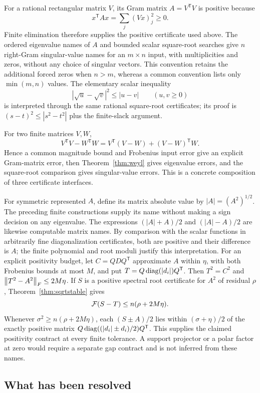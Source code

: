 For a rational rectangular matrix $V$, its Gram matrix $A=V^{\mathsf T}V$ is positive because
\[
 x^{\mathsf T}Ax=\sum_j(Vx)_j^2\ge0.
\]
Finite elimination therefore supplies the positive certificate used above. The ordered eigenvalue names of $A$ and bounded scalar square-root searches give $n$ right-Gram singular-value names for an $m\times n$ input, with multiplicities and zeros, without any choice of singular vectors. This convention retains the additional forced zeros when $n>m$, whereas a common convention lists only $\min(m,n)$ values. The elementary scalar inequality
\[
 |\sqrt u-\sqrt v|^2\le|u-v|\qquad(u,v\ge0)
\]
is interpreted through the same rational square-root certificates; its proof is $(s-t)^2\le|s^2-t^2|$ plus the finite-slack argument.

For two finite matrices $V,W$,
\[
 V^{\mathsf T}V-W^{\mathsf T}W
 =V^{\mathsf T}(V-W)+(V-W)^{\mathsf T}W.
\]
Hence a common magnitude bound and Frobenius input error give an explicit Gram-matrix error, then Theorem~\ref{thm:weyl} gives eigenvalue errors, and the square-root comparison gives singular-value errors. This is a concrete composition of three certificate interfaces.

For symmetric represented $A$, define its matrix absolute value by
$|A|=(A^2)^{1/2}$. The preceding finite constructions supply its name without making a sign decision on any eigenvalue. The expressions $(|A|+A)/2$ and $(|A|-A)/2$ are likewise computable matrix names. By comparison with the scalar functions in arbitrarily fine diagonalization certificates, both are positive and their difference is $A$; the finite polynomial and root moduli justify this interpretation. For an explicit positivity budget, let $C=QDQ^{\mathsf T}$ approximate $A$ within $\eta$, with both Frobenius bounds at most $M$, and put $T=Q\operatorname{diag}(|d_i|)Q^{\mathsf T}$. Then $T^2=C^2$ and $\left\lVert T^2-A^2\right\rVert_F\le2M\eta$. If $S$ is a positive spectral root certificate for $A^2$ of residual $\rho$, Theorem~\ref{thm:sqrtstable} gives
\[
 \mathcal F(S-T)\le n(\rho+2M\eta).
\]
Whenever $\sigma^2\ge n(\rho+2M\eta)$, each $(S\pm A)/2$ lies within $(\sigma+\eta)/2$ of the exactly positive matrix $Q\operatorname{diag}((|d_i|\pm d_i)/2)Q^{\mathsf T}$. This supplies the claimed positivity contract at every finite tolerance. A support projector or a polar factor at zero would require a separate gap contract and is not inferred from these names.

\subsection{What has been resolved}

